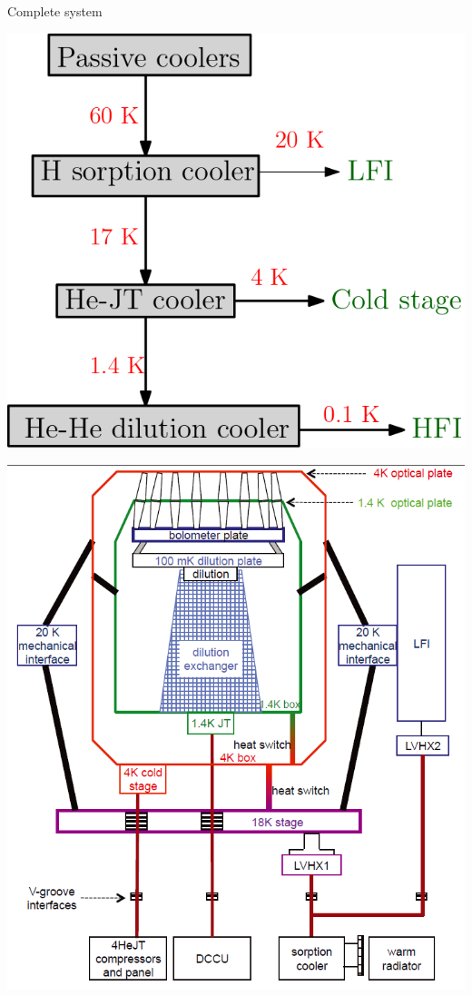 \begin{frame}{Complete system}
\begin{minipage}{0.45\textwidth}
    \includegraphics[width=0.9\linewidth]{Figures/complete.png} 
\end{minipage}
\begin{minipage}{0.45\textwidth}
    \includegraphics[width=0.9\linewidth]{Figures/Diag_complete.png} 
\end{minipage}
\end{frame}
